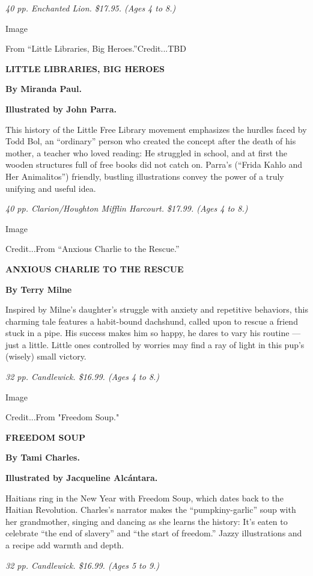 \emph{40 pp. Enchanted Lion. \$17.95. (Ages 4 to 8.)}

Image

From ``Little Libraries, Big Heroes.''Credit...TBD

\textbf{LITTLE LIBRARIES, BIG HEROES}

\textbf{By Miranda Paul.}

\textbf{Illustrated by John Parra.}

This history of the Little Free Library movement emphasizes the hurdles
faced by Todd Bol, an ``ordinary'' person who created the concept after
the death of his mother, a teacher who loved reading: He struggled in
school, and at first the wooden structures full of free books did not
catch on. Parra's (``Frida Kahlo and Her Animalitos'') friendly,
bustling illustrations convey the power of a truly unifying and useful
idea.

\emph{40 pp. Clarion/Houghton Mifflin Harcourt. \$17.99. (Ages 4 to 8.)}

Image

Credit...From ``Anxious Charlie to the Rescue.''

\textbf{ANXIOUS CHARLIE TO THE RESCUE}

\textbf{By Terry Milne}

Inspired by Milne's daughter's struggle with anxiety and repetitive
behaviors, this charming tale features a habit-bound dachshund, called
upon to rescue a friend stuck in a pipe. His success makes him so happy,
he dares to vary his routine --- just a little. Little ones controlled
by worries may find a ray of light in this pup's (wisely) small victory.

\emph{32 pp. Candlewick. \$16.99. (Ages 4 to 8.)}

Image

Credit...From "Freedom Soup."

\textbf{FREEDOM SOUP}

\textbf{By Tami Charles.}

\textbf{Illustrated by Jacqueline Alcántara.}

Haitians ring in the New Year with Freedom Soup, which dates back to the
Haitian Revolution. Charles's narrator makes the ``pumpkiny-garlic''
soup with her grandmother, singing and dancing as she learns the
history: It's eaten to celebrate ``the end of slavery'' and ``the start
of freedom.'' Jazzy illustrations and a recipe add warmth and depth.

\emph{32 pp. Candlewick. \$16.99. (Ages 5 to 9.)}

